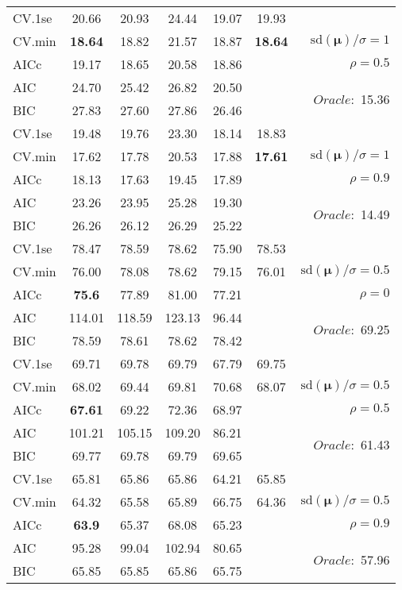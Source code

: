 \begin{table}
\begin{center}
\begin{tabular}{l*{5}{c}|r}
 \hline 
CV.1se & 20.66 & 20.93 & 24.44 & 19.07 & 19.93 & \\
CV.min & {\bf 18.64} & 18.82 & 21.57 & 18.87 & {\bf 18.64} &  $\mathrm{sd}(\mathbf{\mu})/\sigma=1$ \\
AICc & 19.17 & 18.65 & 20.58 & 18.86 & & $\rho=0.5$ \\
AIC & 24.70 & 25.42 & 26.82 & 20.50 & &  \multirow{2}{*}{$Oracle: $ 15.36} \\
BIC & 27.83 & 27.60 & 27.86 & 26.46 & &  \\
 \hline 
CV.1se & 19.48 & 19.76 & 23.30 & 18.14 & 18.83 & \\
CV.min & 17.62 & 17.78 & 20.53 & 17.88 & {\bf 17.61} &  $\mathrm{sd}(\mathbf{\mu})/\sigma=1$ \\
AICc & 18.13 & 17.63 & 19.45 & 17.89 & & $\rho=0.9$ \\
AIC & 23.26 & 23.95 & 25.28 & 19.30 & &  \multirow{2}{*}{$Oracle: $ 14.49} \\
BIC & 26.26 & 26.12 & 26.29 & 25.22 & &  \\
 \hline 
CV.1se & 78.47 & 78.59 & 78.62 & 75.90 & 78.53 & \\
CV.min & 76.00 & 78.08 & 78.62 & 79.15 & 76.01 &  $\mathrm{sd}(\mathbf{\mu})/\sigma=0.5$ \\
AICc & {\bf 75.6} & 77.89 & 81.00 & 77.21 & & $\rho=0$ \\
AIC & 114.01 & 118.59 & 123.13 & 96.44 & &  \multirow{2}{*}{$Oracle: $ 69.25} \\
BIC & 78.59 & 78.61 & 78.62 & 78.42 & &  \\
 \hline 
CV.1se & 69.71 & 69.78 & 69.79 & 67.79 & 69.75 & \\
CV.min & 68.02 & 69.44 & 69.81 & 70.68 & 68.07 &  $\mathrm{sd}(\mathbf{\mu})/\sigma=0.5$ \\
AICc & {\bf 67.61} & 69.22 & 72.36 & 68.97 & & $\rho=0.5$ \\
AIC & 101.21 & 105.15 & 109.20 & 86.21 & &  \multirow{2}{*}{$Oracle: $ 61.43} \\
BIC & 69.77 & 69.78 & 69.79 & 69.65 & &  \\
 \hline 
CV.1se & 65.81 & 65.86 & 65.86 & 64.21 & 65.85 & \\
CV.min & 64.32 & 65.58 & 65.89 & 66.75 & 64.36 &  $\mathrm{sd}(\mathbf{\mu})/\sigma=0.5$ \\
AICc & {\bf 63.9} & 65.37 & 68.08 & 65.23 & & $\rho=0.9$ \\
AIC & 95.28 & 99.04 & 102.94 & 80.65 & &  \multirow{2}{*}{$Oracle: $ 57.96} \\
BIC & 65.85 & 65.85 & 65.86 & 65.75 & &  \\
 \hline 
\end{tabular}
\end{center}
\vspace{-1cm}
\end{table}





